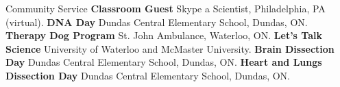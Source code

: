 \begin{rubric}{Community Service}
%
\entry*[2020]%
	\textbf{Classroom Guest} Skype a Scientist, Philadelphia, PA (virtual).	
%
\entry*[2019]%
	\textbf{DNA Day} Dundas Central Elementary School, Dundas, ON. 		
%
\entry*[2018 -- 2019]%
	\textbf{Therapy Dog Program} St. John Ambulance, Waterloo, ON.	
%
\entry*[2012 -- 2019]%
	\textbf{Let's Talk Science} University of Waterloo and McMaster University. 
%
\entry*[2018 -- 2019]%
	\textbf{Brain Dissection Day} Dundas Central Elementary School, Dundas, ON. 	
%
\entry*[2018 -- 2020]%
	\textbf{Heart and Lungs Dissection Day} Dundas Central Elementary School, Dundas, ON. 	
%
%
\end{rubric}
